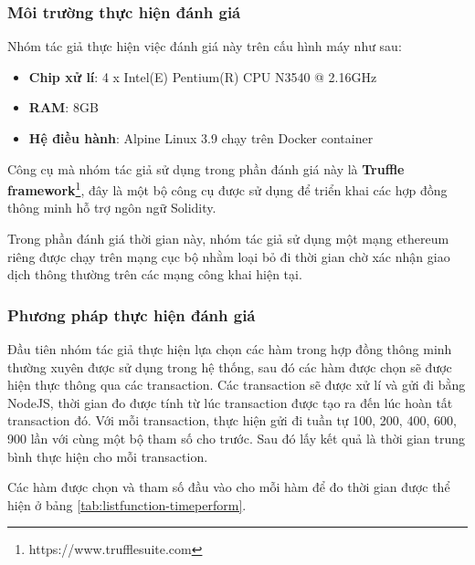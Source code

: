 \documentclass[../main-report.tex]{subfiles}
\begin{document}
\subsubsection{Môi trường thực hiện đánh giá}
Nhóm tác giả thực hiện việc đánh giá này trên cấu hình máy như sau:

\begin{itemize}
\item \textbf{Chip xử lí}: 4 x Intel(E) Pentium(R) CPU N3540 @ 2.16GHz
\item \textbf{RAM}: 8GB
\item \textbf{Hệ điều hành}: Alpine Linux 3.9 chạy trên Docker container
\end{itemize}

Công cụ mà nhóm tác giả sử dụng trong phần đánh giá này là \textbf{Truffle framework}\footnote{https://www.trufflesuite.com}, đây là một bộ công cụ được sử dụng để triển khai các hợp đồng thông minh hỗ trợ ngôn ngữ Solidity.

Trong phần đánh giá thời gian này, nhóm tác giả sử dụng một mạng ethereum riêng được chạy trên mạng cục bộ nhằm loại bỏ đi thời gian chờ xác nhận giao dịch thông thường trên các mạng công khai hiện tại.

\subsubsection{Phương pháp thực hiện đánh giá}
Đầu tiên nhóm tác giả thực hiện lựa chọn các hàm trong hợp đồng thông minh thường xuyên được sử dụng trong hệ thống, sau đó các hàm được chọn sẽ được hiện thực thông qua các \gls{transaction}. Các \gls{transaction} sẽ được xử lí và gửi đi bằng NodeJS, thời gian đo được tính từ lúc \gls{transaction} được tạo ra đến lúc hoàn tất \gls{transaction} đó. Với mỗi \gls{transaction}, thực hiện gửi đi tuần tự 100, 200, 400, 600, 900 lần với cùng một bộ tham số cho trước. Sau đó lấy kết quả là thời gian trung bình thực hiện cho mỗi \gls{transaction}.

Các hàm được chọn và tham số đầu vào cho mỗi hàm để đo thời gian được thể hiện ở bảng \ref{tab:listfunction-timeperform}.
\end{document}
